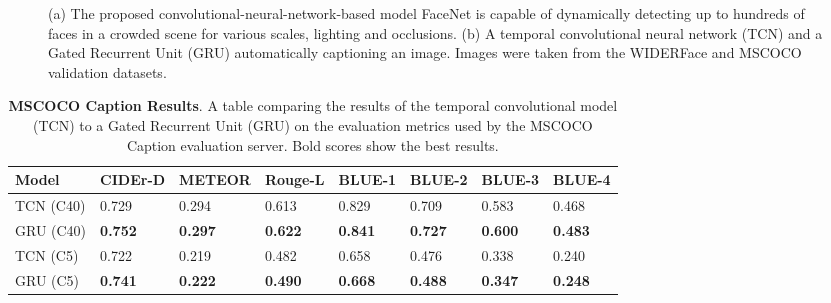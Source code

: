 \documentclass[a4paper, twoside]{article}
\begin{document}
\begin{figure}[h]
    \centering
  	\caption{(a) The proposed convolutional-neural-network-based model FaceNet is capable of dynamically detecting up to hundreds of faces in a crowded scene for various scales, lighting and occlusions. (b) A temporal convolutional neural network (TCN) and a Gated Recurrent Unit (GRU) automatically captioning an image. Images were taken from the WIDERFace \cite{WIDERFace} and MSCOCO \cite{mscoco} validation datasets.} \label{figtcntraingraph}
\end{figure}

\begin{table}
\begin{center}
    \begin{tabular}{| l | l | l | l | l | l| l | l  |}
    \hline
    Model & CIDEr-D & METEOR & Rouge-L & BLUE-1 & BLUE-2 & BLUE-3 & BLUE-4\\ \hline \hline
    TCN (C40) & 0.729 & 0.294 & 0.613 & 0.829 & 0.709 & 0.583 & 0.468 \\ \hline
   	GRU (C40) & \textbf{0.752} & \textbf{0.297}& \textbf{0.622}& \textbf{0.841}& \textbf{0.727}& \textbf{0.600}& \textbf{0.483}\\ \hline \hline
    TCN (C5) & 0.722 & 0.219& 0.482& 0.658& 0.476& 0.338& 0.240\\ \hline
    GRU (C5) & \textbf{0.741} & \textbf{0.222}& \textbf{0.490}& \textbf{0.668}& \textbf{0.488}& \textbf{0.347}& \textbf{0.248}\\ \hline
    \end{tabular}
    \caption{\textbf{MSCOCO Caption Results}. A table comparing the results of the temporal convolutional model (TCN) to a Gated Recurrent Unit (GRU) on the evaluation metrics used by the MSCOCO Caption evaluation server. Bold scores show the best results.} \label{tabimagecaptioning}
\end{center}
\end{table}
\end{document}
